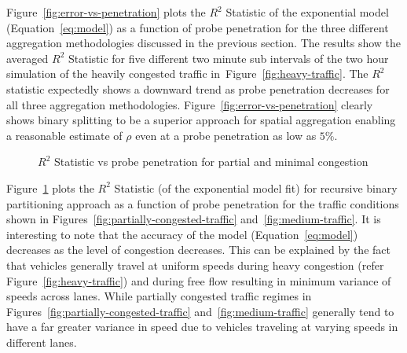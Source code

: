 \documentclass[procedia]{easychair}
\begin{document}
Figure~\ref{fig:error-vs-penetration} plots the $R^2$ Statistic of the exponential model (Equation~\ref{eq:model}) as a function of probe penetration for the three different aggregation methodologies discussed in the previous section. The results show the averaged $R^2$ Statistic for five different two minute sub intervals of the two hour simulation of the heavily congested traffic in~Figure~\ref{fig:heavy-traffic}. The $R^2$ statistic expectedly shows a downward trend as probe penetration decreases for all three aggregation methodologies. Figure~\ref{fig:error-vs-penetration} clearly shows binary splitting  to be a superior approach for spatial aggregation enabling a reasonable estimate of $\rho$ even at a probe penetration as low as $5\%$.  

    \begin{figure}[!htbp]
      \centering
      \caption{$R^2$ Statistic vs probe penetration for partial and minimal congestion}
      \label{fig:error-other-scenarios}
      \end{figure}


 Figure~\ref{fig:error-other-scenarios} plots the $R^2$ Statistic (of the exponential model fit) for recursive binary partitioning approach as a function of probe penetration for the traffic conditions shown in Figures~\ref{fig:partially-congested-traffic} and~\ref{fig:medium-traffic}. It is interesting to note that the accuracy of the model (Equation~\ref{eq:model}) decreases as the level of congestion decreases. This can be explained by the fact that vehicles generally travel at uniform speeds during heavy congestion (refer Figure~\ref{fig:heavy-traffic}) and during free flow resulting in minimum variance of speeds across lanes. While partially congested traffic regimes in Figures~\ref{fig:partially-congested-traffic} and~\ref{fig:medium-traffic} generally tend to have a far greater variance in speed due to vehicles traveling at varying speeds in different lanes.
 
\end{document}
